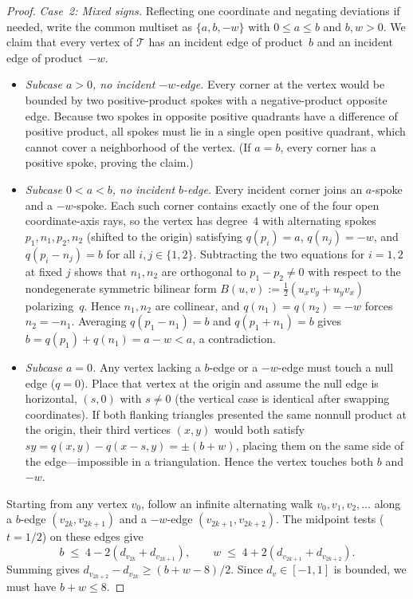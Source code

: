 \documentclass[11pt]{article}
\theoremstyle{plain}
\theoremstyle{definition}
\theoremstyle{remark}
\begin{document}
\begin{proof}
\emph{Case~2: Mixed signs.}
Reflecting one coordinate and negating deviations if needed, write the common multiset as $\{a, b, -w\}$ with $0 \le a \le b$ and $b, w > 0$.
We claim that every vertex of $\mathcal{T}$ has an incident edge of product~$b$ and an incident edge of product~$-w$.
\begin{itemize}[leftmargin=1.6em,itemsep=2pt]
\item \emph{Subcase $a > 0$, no incident $-w$-edge.} Every corner at the vertex would be bounded by two positive-product spokes with a negative-product opposite edge. Because two spokes in opposite positive quadrants have a difference of positive product, all spokes must lie in a single open positive quadrant, which cannot cover a neighborhood of the vertex. (If $a = b$, every corner has a positive spoke, proving the claim.)
\item \emph{Subcase $0 < a < b$, no incident $b$-edge.} Every incident corner joins an $a$-spoke and a $-w$-spoke. Each such corner contains exactly one of the four open coordinate-axis rays, so the vertex has degree~$4$ with alternating spokes $p_1, n_1, p_2, n_2$ (shifted to the origin) satisfying $q(p_i) = a$, $q(n_j) = -w$, and $q(p_i - n_j) = b$ for all $i,j \in \{1,2\}$. Subtracting the two equations for $i = 1,2$ at fixed $j$ shows that $n_1, n_2$ are orthogonal to $p_1 - p_2 \neq 0$ with respect to the nondegenerate symmetric bilinear form $B(u,v) := \frac{1}{2}(u_x v_y + u_y v_x)$ polarizing~$q$. Hence $n_1, n_2$ are collinear, and $q(n_1) = q(n_2) = -w$ forces $n_2 = -n_1$. Averaging $q(p_1 - n_1) = b$ and $q(p_1 + n_1) = b$ gives $b = q(p_1) + q(n_1) = a - w < a$, a contradiction.
\item \emph{Subcase $a = 0$.} Any vertex lacking a $b$-edge or a $-w$-edge must touch a null edge ($q = 0$). Place that vertex at the origin and assume the null edge is horizontal, $(s, 0)$ with $s \neq 0$ (the vertical case is identical after swapping coordinates). If both flanking triangles presented the same nonnull product at the origin, their third vertices $(x,y)$ would both satisfy $sy = q(x,y) - q(x-s,y) = \pm(b+w)$, placing them on the same side of the edge---impossible in a triangulation. Hence the vertex touches both $b$ and $-w$.
\end{itemize}

Starting from any vertex $v_0$, follow an infinite alternating walk $v_0, v_1, v_2, \dots$ along a $b$-edge $(v_{2k}, v_{2k+1})$ and a $-w$-edge $(v_{2k+1}, v_{2k+2})$.
The midpoint tests ($t = 1/2$) on these edges give
\[
b \;\le\; 4 - 2(d_{v_{2k}} + d_{v_{2k+1}}), \qquad w \;\le\; 4 + 2(d_{v_{2k+1}} + d_{v_{2k+2}}).
\]
Summing gives $d_{v_{2k+2}} - d_{v_{2k}} \ge (b + w - 8)/2$. Since $d_v \in [-1,1]$ is bounded, we must have $b + w \le 8$.


\end{proof}
\end{document}
